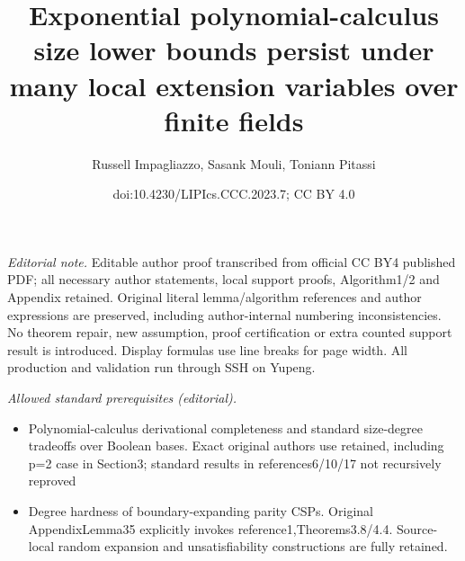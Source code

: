 \documentclass[10pt,a4paper]{article}
\title{Exponential polynomial-calculus size lower bounds persist under many local extension variables over finite fields}
\author{Russell Impagliazzo, Sasank Mouli, Toniann Pitassi}
\date{doi:10.4230/LIPIcs.CCC.2023.7; CC BY 4.0}
\begin{document}
\maketitle
\noindent\textit{Editorial note.} Editable author proof transcribed from official CC BY4 published PDF; all necessary author statements, local support proofs, Algorithm1/2 and Appendix retained. Original literal lemma/algorithm references and author expressions are preserved, including author-internal numbering inconsistencies. No theorem repair, new assumption, proof certification or extra counted support result is introduced. Display formulas use line breaks for page width. All production and validation run through SSH on Yupeng.\par\medskip
\noindent\textit{Allowed standard prerequisites (editorial).}\begin{itemize}
\item Polynomial-calculus derivational completeness and standard size-degree tradeoffs over Boolean bases. Exact original authors use retained, including p=2 case in Section3; standard results in references6/10/17 not recursively reproved
\item Degree hardness of boundary-expanding parity CSPs. Original AppendixLemma35 explicitly invokes reference1,Theorems3.8/4.4. Source-local random expansion and unsatisfiability constructions are fully retained.
\end{itemize}\medskip
\end{document}
